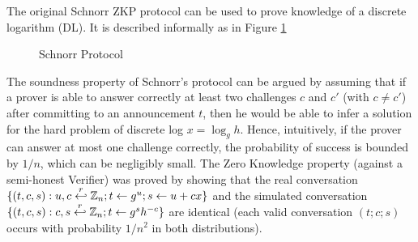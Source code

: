 The original Schnorr ZKP protocol \cite{schnorr1989efficient} can be used to prove
knowledge of a discrete logarithm (DL). It is described informally as in
Figure \ref{fig:schnorrProtocol}

\begin{figure}[htbp!] 
\centering {}
\caption{Schnorr Protocol}
\label{fig:schnorrProtocol}
\end{figure}

The soundness property of Schnorr's protocol can be argued by assuming that if a prover
is able to answer correctly at least two challenges $c$ and $c'$ (with
$c \neq c'$) after committing to an announcement $t$, then he would be able to infer
a solution for the hard problem of discrete log $x = \log_{g}h$. Hence,
intuitively, if the prover can answer at most one challenge correctly, the
probability of success is bounded by $1/n$, which can be negligibly small. The
Zero Knowledge property (against a semi-honest Verifier) was proved by showing
that the real conversation
$\{(t,c,s): u,c \stackrel{r}{\hookleftarrow} \mathbb{Z}_{n}; t \gets g^{u}; s \gets u + cx\}$
and the simulated conversation
$\{(t,c,s): c, s \stackrel{r}{\hookleftarrow} \mathbb{Z}_{n}; t \gets g^{s}h^{-c}\}$ are
identical (each valid conversation $(t;c;s)$ occurs with probability $1/n^{2}$
in both distributions).

